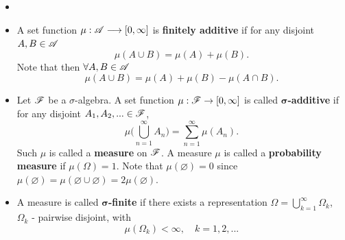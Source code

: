 \begin{definition}
    \begin{itemize}
    \item[]
    \item A set function $\mu : \mathcal{A} \longrightarrow [0, \infty]$ is \textbf{finitely additive} if for any disjoint $A,B \in \mathcal{A}$
    \begin{equation*}
        \mu(A\cup B) = \mu(A) + \mu(B).
    \end{equation*}
    Note that then $\forall A,B \in \mathcal{A}$
    \begin{equation*}
        \mu(A \cup B) = \mu(A)+\mu(B) - \mu(A \cap B).
    \end{equation*}
    \item Let $\mathcal{F}$ be a $\sigma$-algebra. A set function $\mu : \mathcal{F} \rightarrow [0, \infty]$ is called $\bm{\sigma}$\textbf{-additive} if for any disjoint $A_1, A_2, ... \in \mathcal{F}$,
    \begin{equation*}
        \mu \bigg(\bigcup_{n=1}^\infty A_n\bigg) = \sum_{n=1}^\infty \mu(A_n). 
    \end{equation*}
    Such $\mu$ is called a \textbf{measure} on $\mathcal{F}$. A measure $\mu$ is called a \textbf{probability measure} if $\mu (\Omega) = 1$. Note that $\mu (\varnothing) = 0$ since $\mu(\varnothing) = \mu (\varnothing\cup \varnothing) = 2\mu (\varnothing)$. 
    \item A measure is called $\bm{\sigma}$\textbf{-finite} if there exists a representation $\Omega = \bigcup_{k=1}^\infty \Omega_k$, $\Omega_k$ - pairwise disjoint, with
    \begin{equation*}
        \mu(\Omega_k)<\infty, \quad k = 1,2,...
    \end{equation*}
\end{itemize}
\end{definition}

